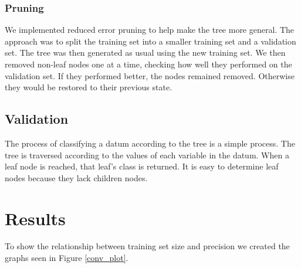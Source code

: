 \documentclass{article}
\begin{document}
	\subsubsection{Pruning}
	We implemented reduced error pruning to help make the tree more general. The approach was to split the training set into a smaller training set and a validation set. The tree was then generated as usual using the new training set. We then removed non-leaf nodes one at a time, checking how well they performed on the validation set. If they performed better, the nodes remained removed. Otherwise they would be restored to their previous state.
	\subsection{Validation}
	The process of classifying a datum according to the tree is a simple process. The tree is traversed according to the values of each variable in the datum. When a leaf node is reached, that leaf's class is returned. It is easy to determine leaf nodes because they lack children nodes.
	
\section{Results}
	To show the relationship between training set size and precision we created the graphs seen in Figure  \ref{conv_plot}.
\end{document}
